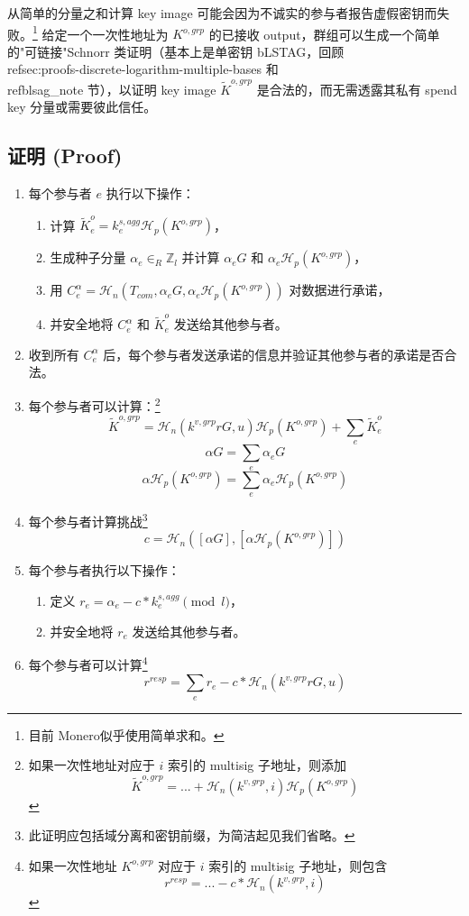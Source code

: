 从简单的分量之和计算 key image 可能会因为不诚实的参与者报告虚假密钥而失败。\footnote{目前 Monero似乎使用简单求和。} 给定一个一次性地址为 $K^{o,grp}$ 的已接收 output，群组可以生成一个简单的"可链接"Schnorr 类证明（基本上是单密钥 bLSTAG，回顾 \\ref{sec:proofs-discrete-logarithm-multiple-bases} 和 \\ref{blsag_note} 节），以证明 key image $\tilde{K}^{o,grp}$ 是合法的，而无需透露其私有 spend key 分量或需要彼此信任。


\subsection*{证明 (Proof)}

\begin{enumerate}
    \item 每个参与者 $e$ 执行以下操作：
    \begin{enumerate}
        \item 计算 $\tilde{K}^{o}_{e} = k^{s,agg}_e \mathcal{H}_p(K^{o,grp})$，
        \item 生成种子分量 $\alpha_e \in_R \mathbb{Z}_l$ 并计算 $\alpha_e G$ 和 $\alpha_e \mathcal{H}_p(K^{o,grp})$，
        \item 用 $C^{\alpha}_{e} = \mathcal{H}_n(T_{com}, \alpha_e G, \alpha_e \mathcal{H}_p(K^{o,grp}))$ 对数据进行承诺，
        \item 并安全地将 $C^{\alpha}_{e}$ 和 $\tilde{K}^{o}_{e}$ 发送给其他参与者。
    \end{enumerate}
    \item 收到所有 $C^{\alpha}_{e}$ 后，每个参与者发送承诺的信息并验证其他参与者的承诺是否合法。
    \item 每个参与者可以计算：\footnote{如果一次性地址对应于 $i$ 索引的 multisig 子地址，则添加
    \[\tilde{K}^{o,grp} = ... + \mathcal{H}_n(k^{v,grp},i) \mathcal{H}_p(K^{o,grp})\]}\vspace{.175cm}
    \[\tilde{K}^{o,grp} = \mathcal{H}_n(k^{v,grp} r G, u) \mathcal{H}_p(K^{o,grp}) + \sum_e \tilde{K}^{o}_{e}\]
    \[\alpha G = \sum_e \alpha_{e} G\]
    \[\alpha \mathcal{H}_p(K^{o,grp}) = \sum_e \alpha_{e} \mathcal{H}_p(K^{o,grp})\]
    \item 每个参与者计算挑战\footnote{此证明应包括域分离和密钥前缀，为简洁起见我们省略。}\vspace{.175cm}
    \[c = \mathcal{H}_n([\alpha G],[\alpha \mathcal{H}_p(K^{o,grp})])\]
    \item 每个参与者执行以下操作：
    \begin{enumerate}
        \item 定义 $r_e = \alpha_e - c*k^{s,agg}_e \pmod l$，
        \item 并安全地将 $r_e$ 发送给其他参与者。
    \end{enumerate}
    \item 每个参与者可以计算\footnote{如果一次性地址 $K^{o,grp}$ 对应于 $i$ 索引的 multisig 子地址，则包含
    \[r^{resp} = ... - c*\mathcal{H}_n(k^{v,grp},i)\]}\vspace{.175cm}
    \[r^{resp} = \sum_e r_e - c*\mathcal{H}_n(k^{v,grp} r G, u)\]
\end{enumerate}

